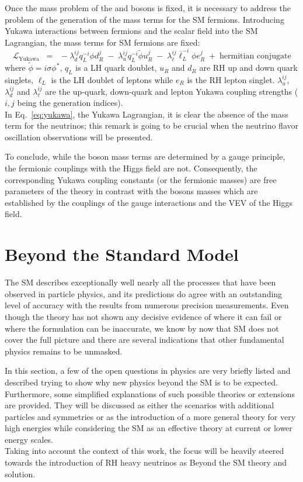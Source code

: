 Once the mass problem of the \PW and \PZ bosons is fixed, it is necessary to address the problem of the generation of the mass terms for the SM fermions. Introducing Yukawa interactions between fermions and the scalar field into the SM Lagrangian, the mass terms for SM fermions are fixed:
\begin{equation}
\label{eq:yukawa}
 \mathcal{L}_{\text{Yukawa}} \;\; = \;\; -\lambda^{ij}_dq^{-i}_L\phi d^j_R \;-\; \lambda^{ij}_uq^{-i}_L\tilde{\phi} u^j_R \;-\; \lambda^{ij}_{\ell}\overline{\ell}^{-i}_L\phi e^j_R \;+\; \text{hermitian conjugate}
\end{equation}
where $\tilde{\phi}= i\sigma\phi^*$, $q_L$ is a LH quark doublet, $u_R$ and $d_R$ are RH up and down quark singlets, $\ell_L$ is the LH doublet of leptons while $e_R$ is the RH lepton singlet. $\lambda^{ij}_u$, $\lambda^{ij}_d$ and $\lambda^{ij}_\ell$ are the up-quark, down-quark and lepton Yukawa coupling strengths ($i,j$ being the generation indices). \\
In Eq.~\ref{eq:yukawa}, the Yukawa Lagrangian, it is clear the absence of the mass term for the neutrinos; this remark is going to be crucial when the neutrino flavor oscillation observations will be presented.

To conclude, while the boson mass terms are determined by a gauge principle, the fermionic couplings with the Higgs field are not. Consequently, the corresponding Yukawa coupling constants (or the fermionic masses) are free parameters of the theory in contrast with the bosons masses which 
 are established by the couplings of the gauge interactions and the VEV of the Higgs field.


\clearpage
\section{Beyond the Standard Model}\label{sec:bsm}
The SM describes exceptionally well nearly all the processes that have been observed in particle physics, and its predictions do agree with an outstanding level of accuracy with the results from numerous precision measurements. Even though the theory has not shown any decisive evidence of where it can fail or where the formulation can be inaccurate, we know by now that SM does not cover the full picture and there are several indications that other fundamental physics remains to be unmasked.

In this section, a few of the open questions in physics are very briefly listed and described trying to show why new physics beyond the SM is to be expected. Furthermore, some simplified explanations of such possible theories or extensions are provided. They will be discussed as either the scenarios with additional particles and symmetries or as the introduction of a more general theory for very high energies while considering the SM as an effective theory at current or lower energy scales.\\
Taking into account the context of this work, the focus will be heavily steered towards the introduction of RH heavy neutrinos as Beyond the SM theory and solution.



